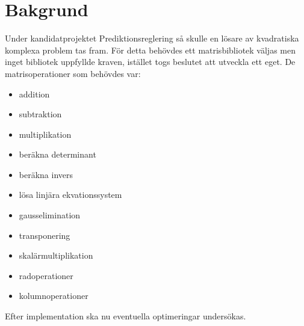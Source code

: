 \section{Bakgrund}
Under kandidatprojektet Prediktionsreglering så skulle en lösare av kvadratiska komplexa problem tas fram. För detta behövdes ett matrisbibliotek väljas men inget bibliotek uppfyllde kraven, istället togs beslutet att utveckla ett eget. De matrisoperationer som behövdes var:

\begin{itemize}
\item addition
\item subtraktion
\item multiplikation
\item beräkna determinant
\item beräkna invers
\item lösa linjära ekvationssystem
\item gausselimination
\item transponering
\item skalärmultiplikation
\item radoperationer
\item kolumnoperationer
\end{itemize}

Efter implementation ska nu eventuella optimeringar undersökas. 

